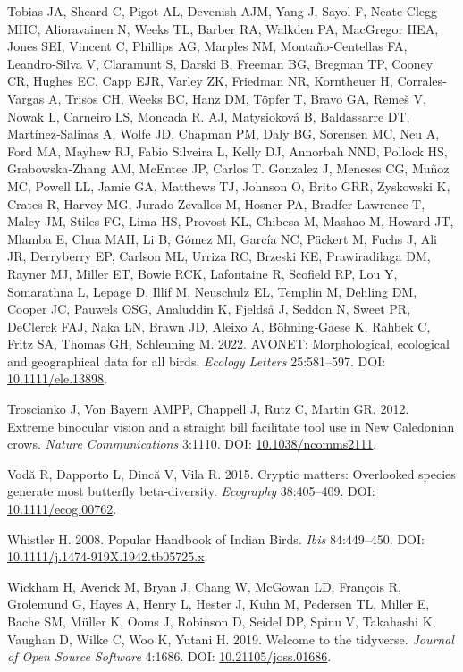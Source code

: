 \documentclass[10pt,a4paper]{article}
\newlength{\cslhangindent}
\newenvironment{CSLReferences}[2] %
 {\begin{list}{}{%
  \setlength{\itemindent}{0pt}
  \setlength{\leftmargin}{0pt}
  \setlength{\parsep}{0pt}
  \ifodd #1
   \setlength{\leftmargin}{\cslhangindent}
   \setlength{\itemindent}{-1\cslhangindent}
  \fi
  \setlength{\itemsep}{#2\baselineskip}}}
 {\end{list}}
\begin{document}
\begin{CSLReferences}{1}{0}
Tobias JA, Sheard C, Pigot AL, Devenish AJM, Yang J, Sayol F, Neate‐Clegg MHC, Alioravainen N, Weeks TL, Barber RA, Walkden PA, MacGregor HEA, Jones SEI, Vincent C, Phillips AG, Marples NM, Montaño‐Centellas FA, Leandro‐Silva V, Claramunt S, Darski B, Freeman BG, Bregman TP, Cooney CR, Hughes EC, Capp EJR, Varley ZK, Friedman NR, Korntheuer H, Corrales‐Vargas A, Trisos CH, Weeks BC, Hanz DM, Töpfer T, Bravo GA, Remeš V, Nowak L, Carneiro LS, Moncada R. AJ, Matysioková B, Baldassarre DT, Martínez‐Salinas A, Wolfe JD, Chapman PM, Daly BG, Sorensen MC, Neu A, Ford MA, Mayhew RJ, Fabio Silveira L, Kelly DJ, Annorbah NND, Pollock HS, Grabowska‐Zhang AM, McEntee JP, Carlos T. Gonzalez J, Meneses CG, Muñoz MC, Powell LL, Jamie GA, Matthews TJ, Johnson O, Brito GRR, Zyskowski K, Crates R, Harvey MG, Jurado Zevallos M, Hosner PA, Bradfer‐Lawrence T, Maley JM, Stiles FG, Lima HS, Provost KL, Chibesa M, Mashao M, Howard JT, Mlamba E, Chua MAH, Li B, Gómez MI, García NC, Päckert M, Fuchs J, Ali JR, Derryberry EP, Carlson ML, Urriza RC, Brzeski KE, Prawiradilaga DM, Rayner MJ, Miller ET, Bowie RCK, Lafontaine R, Scofield RP, Lou Y, Somarathna L, Lepage D, Illif M, Neuschulz EL, Templin M, Dehling DM, Cooper JC, Pauwels OSG, Analuddin K, Fjeldså J, Seddon N, Sweet PR, DeClerck FAJ, Naka LN, Brawn JD, Aleixo A, Böhning‐Gaese K, Rahbek C, Fritz SA, Thomas GH, Schleuning M. 2022. {AVONET}: Morphological, ecological and geographical data for all birds. \emph{Ecology Letters} 25:581--597. DOI: \href{https://doi.org/10.1111/ele.13898}{10.1111/ele.13898}.

Troscianko J, Von Bayern AMPP, Chappell J, Rutz C, Martin GR. 2012. Extreme binocular vision and a straight bill facilitate tool use in {New} {Caledonian} crows. \emph{Nature Communications} 3:1110. DOI: \href{https://doi.org/10.1038/ncomms2111}{10.1038/ncomms2111}.

Vodă R, Dapporto L, Dincă V, Vila R. 2015. Cryptic matters: Overlooked species generate most butterfly beta‐diversity. \emph{Ecography} 38:405--409. DOI: \href{https://doi.org/10.1111/ecog.00762}{10.1111/ecog.00762}.

Whistler H. 2008. Popular {Handbook} of {Indian} {Birds}. \emph{Ibis} 84:449--450. DOI: \href{https://doi.org/10.1111/j.1474-919X.1942.tb05725.x}{10.1111/j.1474-919X.1942.tb05725.x}.

Wickham H, Averick M, Bryan J, Chang W, McGowan LD, François R, Grolemund G, Hayes A, Henry L, Hester J, Kuhn M, Pedersen TL, Miller E, Bache SM, Müller K, Ooms J, Robinson D, Seidel DP, Spinu V, Takahashi K, Vaughan D, Wilke C, Woo K, Yutani H. 2019. Welcome to the {tidyverse}. \emph{Journal of Open Source Software} 4:1686. DOI: \href{https://doi.org/10.21105/joss.01686}{10.21105/joss.01686}.


\end{CSLReferences}
\end{document}
